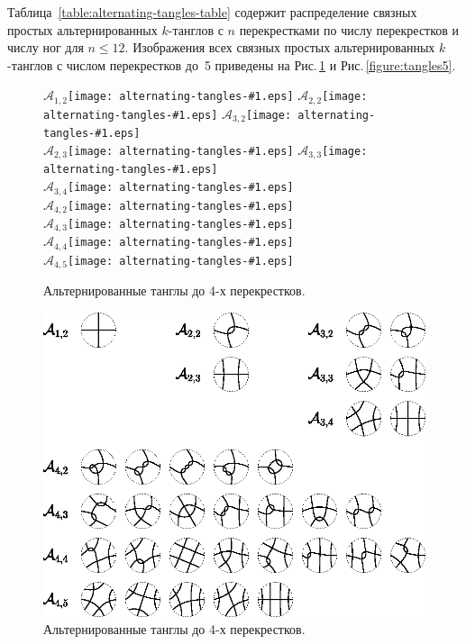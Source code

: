\documentclass[12pt]{article}
\theoremstyle{plain}
\theoremstyle{definition}
\def\figureref#1{Рис.\,\protect\ref{#1}}
\begin{document}
		Таблица~\ref{table:alternating-tangles-table} содержит распределение связных простых альтернированных $k$-танглов с $n$
		перекрестками по числу перекрестков и числу ног для $n \le 12$. Изображения всех связных простых альтернированных $k$-танглов
		с числом перекрестков до~5 приведены на \figureref{figure:tangles14} и \figureref{figure:tangles5}.

		\begin{figure}[ht]
			\centering
			\def\pic#1{\hbox{\protect\texttt{[image: alternating-tangles-\#1.eps]}}}

			$\mathcal A_{1,2}$\pic{1} \qquad $\mathcal A_{2,2}$\pic{2} \qquad $\mathcal A_{3,2}$\pic{4} \\
			                                 $\mathcal A_{2,3}$\pic{3} \qquad $\mathcal A_{3,3}$\pic{5} \\
			                                                                  $\mathcal A_{3,4}$\pic{6} \\

			$\mathcal A_{4,2}$\pic{7} \\
			$\mathcal A_{4,3}$\pic{8} \\
			$\mathcal A_{4,4}$\pic{9} \\
			$\mathcal A_{4,5}$\pic{10}

			\caption{\footnotesize Альтернированные танглы до 4-х перекрестков.}
		\end{figure}

		\begin{figure}[ht]
			\centering
			\includegraphics[scale=0.8]{c/alternating-tangles-1-4.eps}
			\caption{\footnotesize Альтернированные танглы до 4-х перекрестков.\label{figure:tangles14}}
		\end{figure}
\end{document}
